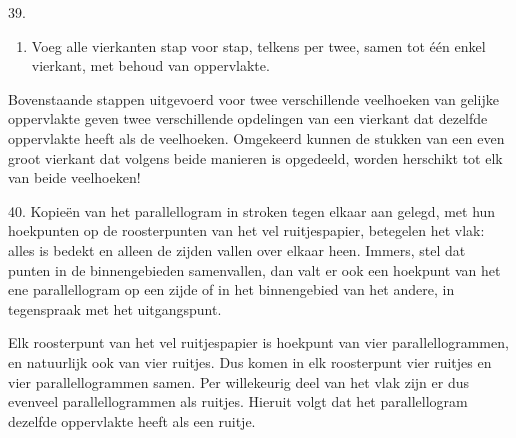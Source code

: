 \begin{problem}{39.}
\begin{enumerate}
        \item Voeg alle vierkanten stap voor stap, telkens per twee, samen tot één enkel vierkant, met behoud van oppervlakte.

    \end{enumerate}

    Bovenstaande stappen uitgevoerd voor twee verschillende veelhoe\-ken van gelijke oppervlakte geven twee verschillende opdelingen van een vierkant dat dezelfde oppervlakte heeft als de veelhoeken. Omge\-keerd kunnen de stukken van een even groot vierkant dat volgens beide manieren is opgedeeld, worden herschikt tot elk van beide veelhoeken!
\end{problem}

\clearpage

\begin{problem}{40.}
    Kopieën van het parallellogram in stroken tegen elkaar aan ge\-legd, met hun hoekpunten op de roosterpunten van het vel ruitjes\-papier, betegelen het vlak: alles is bedekt en alleen de zijden vallen over elkaar heen. Immers, stel dat punten in de binnengebieden samen\-vallen, dan valt er ook een hoekpunt van het ene parallellogram op een zijde of in het binnengebied van het andere, in tegenspraak met het uitgangspunt.

    Elk roosterpunt van het vel ruitjespapier is hoekpunt van vier parallellogrammen, en natuurlijk ook van vier ruitjes. Dus komen in elk roosterpunt vier ruitjes en vier parallellogrammen samen. Per willekeurig deel van het vlak zijn er dus evenveel parallellogrammen als ruitjes. Hieruit volgt dat het parallellogram dezelfde oppervlakte heeft als een ruitje.
\end{problem}


